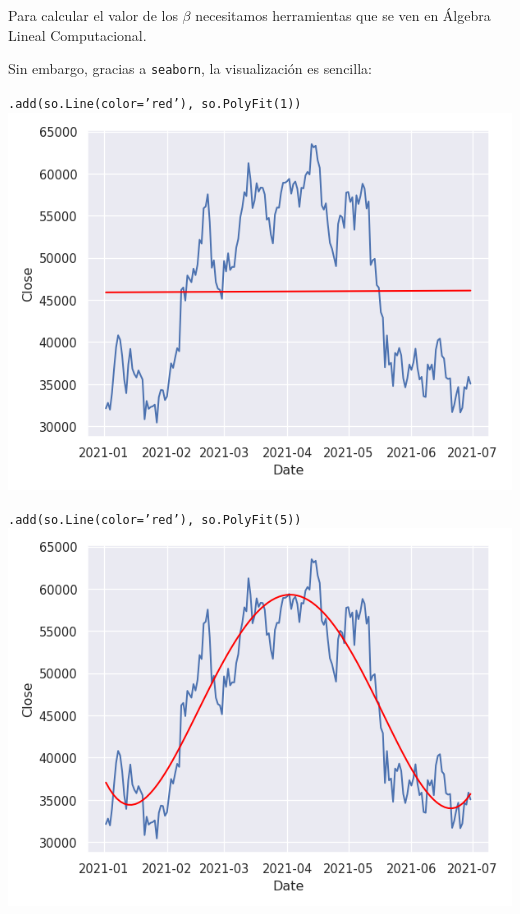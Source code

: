 \documentclass[aspectratio=169, usenames,dvipsnames]{beamer}
\begin{document}
\begin{frame}
    Para calcular el valor de los $\beta$ necesitamos herramientas que se ven en \alert{Álgebra Lineal Computacional}.

    Sin embargo, gracias a \texttt{seaborn}, la visualización es sencilla:
\end{frame}

\begin{frame}
    \centering
    \texttt{.add(so.Line(color='red'), so.PolyFit(1))}
    \includegraphics[width=0.75\linewidth]{img/bitcoin_lr.png}
\end{frame}

\begin{frame}
    \centering
    \texttt{.add(so.Line(color='red'), so.PolyFit(5))}
    \includegraphics[width=0.75\linewidth]{img/bitcoin_lsq.png}
\end{frame}
\end{document}
